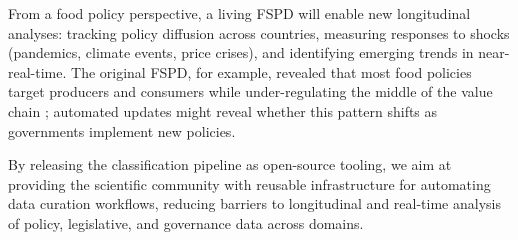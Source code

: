\documentclass[a4paper,12pt]{article}
\begin{document}
From a food policy perspective, a living FSPD will enable new longitudinal analyses: tracking policy diffusion across countries, measuring responses to shocks (pandemics, climate events, price crises), and identifying emerging trends in near-real-time. The original FSPD, for example, revealed that most food policies target producers and consumers while under-regulating the middle of the value chain \cite{lowder2025}; automated updates might reveal whether this pattern shifts as governments implement new policies.

By releasing the classification pipeline as open-source tooling, we aim at providing the scientific community with reusable infrastructure for automating data curation workflows, reducing barriers to longitudinal and real-time analysis of policy, legislative, and governance data across domains.


\end{document}
